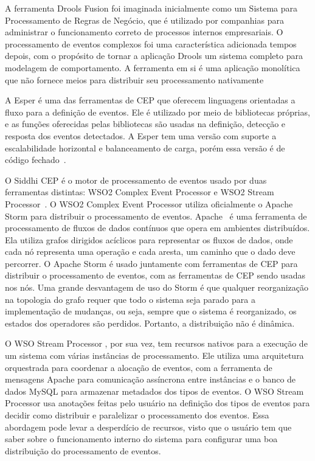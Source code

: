 A ferramenta Drools Fusion foi imaginada inicialmente como um Sistema para Processamento de Regras de Negócio, que é utilizado por companhias para administrar o funcionamento correto de processos internos empresariais. O processamento de eventos complexos foi uma característica adicionada tempos depois, com o propósito de tornar a aplicação Drools um sistema completo para modelagem de comportamento. A ferramenta em si é uma aplicação monolítica que não fornece meios para distribuir seu processamento nativamente~\citep{DroolsFusion} %

A Esper é uma das ferramentas de CEP que oferecem linguagens orientadas a fluxo para a definição de eventos. Ele é utilizado por meio de bibliotecas próprias, e as funções oferecidas pelas bibliotecas são usadas na definição, detecção e resposta dos eventos detectados. A Esper tem uma versão com suporte a escalabilidade horizontal e balanceamento de carga, porém essa versão é de código fechado~\citep{ESPERMatrix}.

O Siddhi CEP é o motor de processamento de eventos usado
por duas ferramentas distintas: WSO2 Complex Event Processor e WSO2 Stream Processor~\citep{WSO2vsSiddhi}.
O WSO2 Complex Event Processor \citep{WSO2CEP} utiliza oficialmente o Apache Storm para distribuir o processamento de eventos. Apache~\cite{Storm} é uma ferramenta de processamento de fluxos de dados contínuos que opera em ambientes distribuídos. Ela utiliza grafos dirigidos acíclicos para representar os fluxos de dados, onde cada nó representa uma operação e cada aresta, um caminho que o dado deve percorrer. O Apache Storm é usado juntamente com ferramentas de CEP para distribuir o processamento de eventos, com as ferramentas de CEP sendo usadas nos nós. Uma grande desvantagem de uso do Storm é que qualquer reorganização na topologia do grafo requer que todo o sistema seja parado para a implementação de mudanças, ou seja, sempre que o sistema é reorganizado, os estados dos operadores são perdidos. Portanto, a distribuição não é dinâmica.

O WSO Stream Processor \citep{WSO2SP}, por sua vez, tem recursos nativos para a execução de um sistema com várias instâncias de processamento. Ele utiliza uma arquitetura orquestrada para coordenar a alocação de eventos, com a ferramenta de mensagens Apache \cite{Kafka} para comunicação assíncrona entre instâncias e o banco de dados MySQL para armazenar metadados dos tipos de eventos. O WSO Stream Processor usa anotações feitas pelo usuário na definição dos tipos de eventos para decidir como distribuir e paralelizar o processamento dos eventos. Essa abordagem pode levar a desperdício de recursos, visto que o usuário tem que saber sobre o funcionamento interno do sistema para configurar uma boa distribuição do processamento de eventos.



